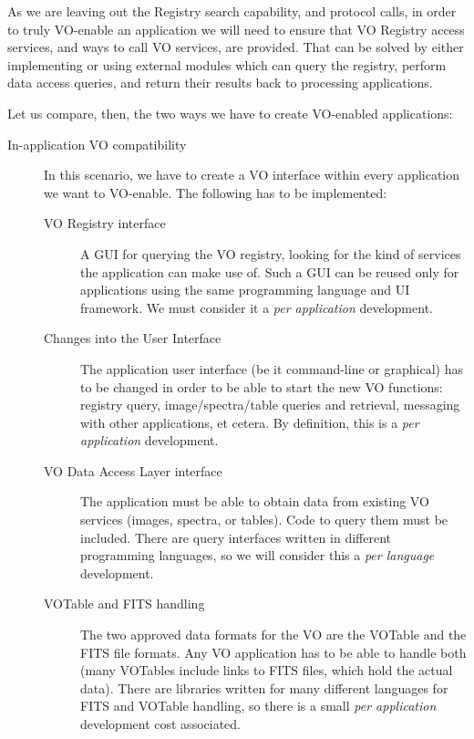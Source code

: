 		As we are leaving out the Registry search capability, and
		protocol calls, in order to truly VO-enable an application
		we will need to ensure that VO Registry access services, and
		ways to call VO services, are provided.
		That can be solved by either implementing or using external
		modules which can query the registry, perform data access
		queries, and return their results back to processing
		applications.
		
		Let us compare, then, the two ways we have to create
		VO-enabled applications:
		
		\begin{description}
			\item[In-application VO compatibility] In this scenario,
			we have to create a VO interface within every
			application we want to VO-enable. The following has
			to be implemented:
			
			\begin{description}
				\item[VO Registry interface] A GUI for querying the
				VO registry, looking for the kind of services the
				application can make use of. Such a GUI can be
				reused only for applications using the same
				programming language and UI framework. We must
				consider it a \emph{per application} development.
				
				\item[Changes into the User Interface] The
				application user interface (be it command-line or
				graphical) has to be changed in order to be able to
				start the new VO functions: registry query,
				image/spectra/table queries and retrieval,
				messaging with other applications, et cetera. By
				definition, this is a \emph{per application}
				development.
				
				\item[VO Data Access Layer interface] The
				application must be able to obtain data from
				existing VO services (images, spectra, or tables).
				Code to query them must be included. There are
				query interfaces written in different programming
				languages, so we will consider this a \emph{per
				language} development.
				
				\item[VOTable and FITS handling] The two approved
				data formats for the VO are the VOTable and the
				FITS file formats. Any VO application has to be
				able to handle both (many VOTables include links to
				FITS files, which hold the actual data). There are
				libraries written for many different languages for
				FITS and VOTable handling, so there is a small
				\emph{per application} development cost associated.
				

\end{description}
\end{description}
